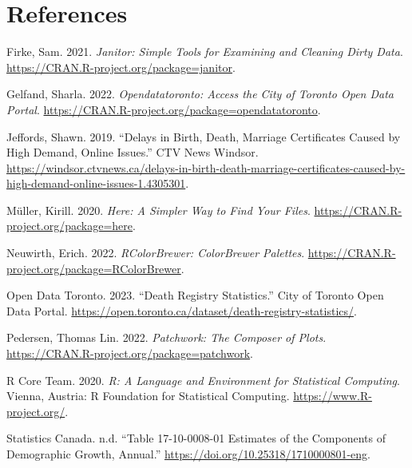 \documentclass[
  letterpaper,
  DIV=11,
  numbers=noendperiod]{scrartcl}
\newlength{\cslhangindent}
\newlength{\cslentryspacingunit} %
\newenvironment{CSLReferences}[2] %
 {%
  \setlength{\parindent}{0pt}
  \ifodd #1
  \let\oldpar\par
  \def\par{\hangindent=\cslhangindent\oldpar}
  \fi
  \setlength{\parskip}{#2\cslentryspacingunit}
 }%
 {}
\begin{document}
\clearpage

\hypertarget{references}{%
\section*{References}\label{references}}

\hypertarget{refs}{}
\begin{CSLReferences}{1}{0}
\leavevmode{}%
Firke, Sam. 2021. \emph{Janitor: Simple Tools for Examining and Cleaning
Dirty Data}. \url{https://CRAN.R-project.org/package=janitor}.

\leavevmode{}%
Gelfand, Sharla. 2022. \emph{Opendatatoronto: Access the City of Toronto
Open Data Portal}.
\url{https://CRAN.R-project.org/package=opendatatoronto}.

\leavevmode{}%
Jeffords, Shawn. 2019. {``Delays in Birth, Death, Marriage Certificates
Caused by High Demand, Online Issues.''} CTV News Windsor.
\url{https://windsor.ctvnews.ca/delays-in-birth-death-marriage-certificates-caused-by-high-demand-online-issues-1.4305301}.

\leavevmode{}%
Müller, Kirill. 2020. \emph{Here: A Simpler Way to Find Your Files}.
\url{https://CRAN.R-project.org/package=here}.

\leavevmode{}%
Neuwirth, Erich. 2022. \emph{RColorBrewer: ColorBrewer Palettes}.
\url{https://CRAN.R-project.org/package=RColorBrewer}.

\leavevmode{}%
Open Data Toronto. 2023. {``Death Registry Statistics.''} City of
Toronto Open Data Portal.
\url{https://open.toronto.ca/dataset/death-registry-statistics/}.

\leavevmode{}%
Pedersen, Thomas Lin. 2022. \emph{Patchwork: The Composer of Plots}.
\url{https://CRAN.R-project.org/package=patchwork}.

\leavevmode{}%
R Core Team. 2020. \emph{R: A Language and Environment for Statistical
Computing}. Vienna, Austria: R Foundation for Statistical Computing.
\url{https://www.R-project.org/}.

\leavevmode{}%
Statistics Canada. n.d. {``Table 17-10-0008-01 Estimates of the
Components of Demographic Growth, Annual.''}
\url{https://doi.org/10.25318/1710000801-eng}.


\end{CSLReferences}
\end{document}
